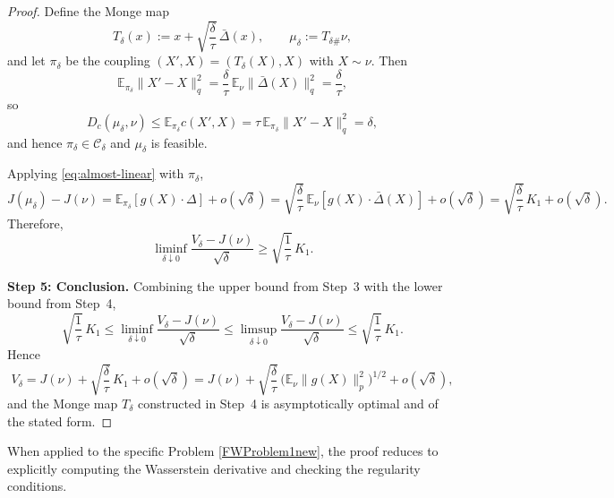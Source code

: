 \documentclass[11pt]{article}
\theoremstyle{definition}
\newcommand{\E}{\mathbb{E}}
\begin{document}
\begin{proof}
Define the Monge map
\[
  T_\delta(x) := x + \sqrt{\frac{\delta}{\tau}}\,\bar{\Delta}(x),
  \qquad
  \mu_\delta := T_{\delta\#}\nu,
\]
and let $\pi_\delta$ be the coupling $(X',X)=(T_\delta(X),X)$ with $X\sim\nu$.
Then
\[
  \E_{\pi_\delta}\|X'-X\|_q^2
  = \frac{\delta}{\tau}\,\E_\nu\|\bar{\Delta}(X)\|_q^2
  = \frac{\delta}{\tau},
\]
so
\[
  D_c(\mu_\delta,\nu)
  \le \E_{\pi_\delta} c(X', X)
  = \tau\,\E_{\pi_\delta}\|X'-X\|_q^2
  = \delta,
\]
and hence $\pi_\delta\in\mathcal{C}_\delta$ and $\mu_\delta$ is feasible.

Applying \eqref{eq:almost-linear} with $\pi_\delta$,
\[
  J(\mu_\delta)-J(\nu)
  = \E_{\pi_\delta}[g(X)\cdot\Delta] + o(\sqrt{\delta})
  = \sqrt{\frac{\delta}{\tau}}\,
      \E_\nu[g(X)\cdot\bar{\Delta}(X)]
      + o(\sqrt{\delta})
  = \sqrt{\frac{\delta}{\tau}}\,K_1 + o(\sqrt{\delta}).
\]
Therefore,
\[
  \liminf_{\delta\downarrow 0}
  \frac{V_\delta - J(\nu)}{\sqrt{\delta}}
  \ge \sqrt{\frac{1}{\tau}}\,K_1.
\]

\medskip
\noindent\textbf{Step 5: Conclusion.}
Combining the upper bound from Step~3 with the lower bound from Step~4,
\[
  \sqrt{\frac{1}{\tau}}\,K_1
  \le \liminf_{\delta\downarrow 0}
     \frac{V_\delta - J(\nu)}{\sqrt{\delta}}
  \le \limsup_{\delta\downarrow 0}
     \frac{V_\delta - J(\nu)}{\sqrt{\delta}}
  \le \sqrt{\frac{1}{\tau}}\,K_1.
\]
Hence
\[
  V_\delta
  = J(\nu) + \sqrt{\frac{\delta}{\tau}}\,K_1 + o(\sqrt{\delta})
  = J(\nu)
    + \sqrt{\frac{\delta}{\tau}}\,
      \Big(\E_\nu\|g(X)\|_p^2\Big)^{1/2}
    + o(\sqrt{\delta}),
\]
and the Monge map $T_\delta$ constructed in Step~4 is asymptotically optimal
and of the stated form.
\end{proof}


When applied to the specific Problem \eqref{FWProblem1new}, the proof reduces to explicitly computing the Wasserstein derivative and checking the regularity conditions.
\end{document}
